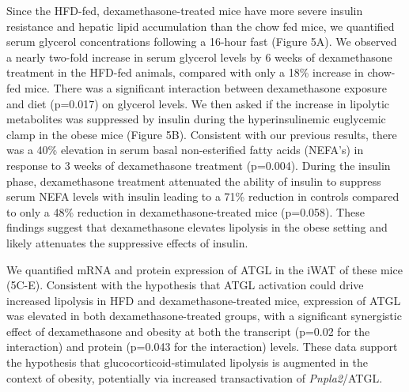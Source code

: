 \documentclass[11pt]{article} %
\begin{document}
Since the HFD-fed, dexamethasone-treated mice have more severe insulin
resistance and hepatic lipid accumulation than the chow fed mice, we
quantified serum glycerol concentrations following a 16-hour fast
(Figure 5A). We observed a nearly two-fold increase in serum glycerol
levels by 6 weeks of dexamethasone treatment in the HFD-fed animals,
compared with only a 18\% increase in chow-fed mice. There was a
significant interaction between dexamethasone exposure and diet
(p=0.017) on glycerol levels. We then asked if the increase in lipolytic
metabolites was suppressed by insulin during the hyperinsulinemic
euglycemic clamp in the obese mice (Figure 5B). Consistent with our
previous results, there was a 40\% elevation in serum basal
non-esterified fatty acids (NEFA's) in response to 3 weeks of
dexamethasone treatment (p=0.004). During the insulin phase,
dexamethasone treatment attenuated the ability of insulin to suppress
serum NEFA levels with insulin leading to a 71\% reduction in controls
compared to only a 48\% reduction in dexamethasone-treated mice
(p=0.058). These findings suggest that dexamethasone elevates lipolysis
in the obese setting and likely attenuates the suppressive effects of
insulin.

We quantified mRNA and protein expression of ATGL in the iWAT of these
mice (5C-E). Consistent with the hypothesis that ATGL activation could
drive increased lipolysis in HFD and dexamethasone-treated mice,
expression of ATGL was elevated in both dexamethasone-treated groups,
with a significant synergistic effect of dexamethasone and obesity at
both the transcript (p=0.02 for the interaction) and protein (p=0.043
for the interaction) levels. These data support the hypothesis that
glucocorticoid-stimulated lipolysis is augmented in the context of
obesity, potentially via increased transactivation of \textit{Pnpla2}/ATGL.
\end{document}
